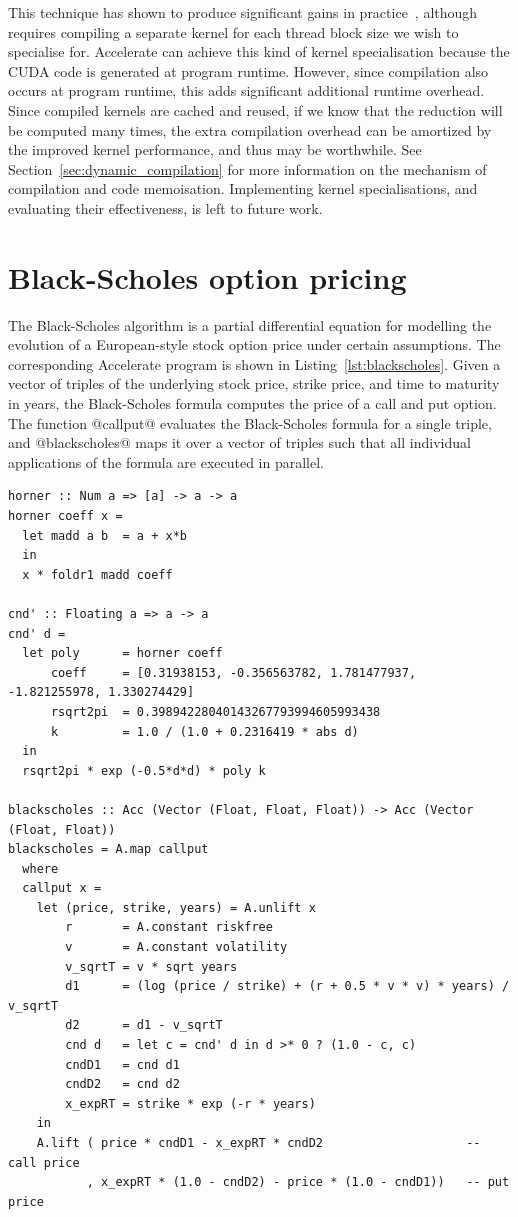 This technique has shown to produce significant gains in
practice~\cite{Harris:2007te}, although requires compiling a separate kernel for
each thread block size we wish to specialise for. Accelerate can achieve this
kind of kernel specialisation because the CUDA code is generated at program
runtime. However, since compilation also occurs at program runtime, this adds
significant additional runtime overhead. Since compiled kernels are cached and
reused, if we know that the reduction will be computed many times, the extra
compilation overhead can be amortized by the improved kernel performance, and
thus may be worthwhile. See Section~\ref{sec:dynamic_compilation} for more
information on the mechanism of compilation and code memoisation. Implementing
kernel specialisations, and evaluating their effectiveness, is left to future
work.


\section{Black-Scholes option pricing}
\label{sec:blackscholes}

The Black-Scholes algorithm is a partial differential equation for modelling the
evolution of a European-style stock option price under certain assumptions. The
corresponding Accelerate program is shown in Listing~\ref{lst:blackscholes}.
Given a vector of triples of the underlying stock price, strike price, and time
to maturity in years, the Black-Scholes formula computes the price of a call and
put option. The function @callput@ evaluates the Black-Scholes formula for
a single triple, and @blackscholes@ maps it over a vector of triples such
that all individual applications of the formula are executed in parallel.

\begin{lstlisting}[style=haskell_float
    ,float
    ,label=lst:blackscholes
    ,caption={Black-Scholes option pricing in Accelerate}]
horner :: Num a => [a] -> a -> a
horner coeff x =
  let madd a b  = a + x*b
  in
  x * foldr1 madd coeff

cnd' :: Floating a => a -> a
cnd' d =
  let poly      = horner coeff
      coeff     = [0.31938153, -0.356563782, 1.781477937, -1.821255978, 1.330274429]
      rsqrt2pi  = 0.39894228040143267793994605993438
      k         = 1.0 / (1.0 + 0.2316419 * abs d)
  in
  rsqrt2pi * exp (-0.5*d*d) * poly k

blackscholes :: Acc (Vector (Float, Float, Float)) -> Acc (Vector (Float, Float))
blackscholes = A.map callput
  where
  callput x =
    let (price, strike, years) = A.unlift x
        r       = A.constant riskfree
        v       = A.constant volatility
        v_sqrtT = v * sqrt years
        d1      = (log (price / strike) + (r + 0.5 * v * v) * years) / v_sqrtT
        d2      = d1 - v_sqrtT
        cnd d   = let c = cnd' d in d >* 0 ? (1.0 - c, c)
        cndD1   = cnd d1
        cndD2   = cnd d2
        x_expRT = strike * exp (-r * years)
    in
    A.lift ( price * cndD1 - x_expRT * cndD2                    -- call price
           , x_expRT * (1.0 - cndD2) - price * (1.0 - cndD1))   -- put price
\end{lstlisting}

